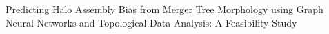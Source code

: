 \documentclass[twocolumn]{aastex631}
\begin{document}
Predicting Halo Assembly Bias from Merger Tree Morphology using Graph Neural Networks and Topological Data Analysis: A Feasibility Study
\end{document}

